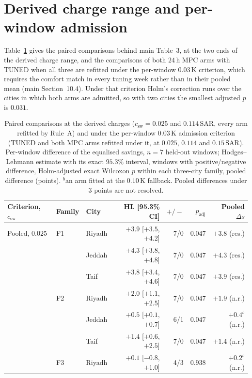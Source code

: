 \documentclass[11pt]{article}
\newcommand{\csw}{c_{\mathrm{sw}}}
\newcommand{\SAR}{\text{SAR}}
\begin{document}
\section{Derived charge range and per-window admission}
\label{sec:s-derived}

Table~\ref{tab:s-derived} gives the paired comparisons behind main Table~3, at the two ends of the derived charge range, and the comparisons of both $24\,$h MPC arms with TUNED when all three are refitted under the per-window $0.03\,$K criterion, which requires the comfort match in every tuning week rather than in their pooled mean (main Section~10.4). Under that criterion Holm's correction runs over the cities in which both arms are admitted, so with two cities the smallest adjusted $p$ is $0.031$.

\begin{table}[!ht]
\centering
\caption{Paired comparisons at the derived charges ($\csw=0.025$ and $0.114\,\SAR$, every arm refitted by Rule~A) and under the per-window $0.03\,$K admission criterion (TUNED and both MPC arms refitted under it, at $0.025$, $0.114$ and $0.15\,\SAR$). Per-window difference of the equalised savings, $n=7$ held-out windows; Hodges--Lehmann estimate with its exact $95.3\%$ interval, windows with positive/negative difference, Holm-adjusted exact Wilcoxon $p$ within each three-city family, pooled difference (points). $^{b}$an arm fitted at the $0.10\,$K fallback. Pooled differences under $3$ points are not resolved.}
\label{tab:s-derived}
\scriptsize
\setlength{\tabcolsep}{3pt}
\begin{tabularx}{\textwidth}{@{}llXrrrr@{}}
\toprule
Criterion, $\csw$ & Family & City & HL [95.3\% CI] & $+/-$ & $p_{\mathrm{adj}}$ & Pooled $\Delta s$ \\
\midrule
Pooled, $0.025$ & F1 & Riyadh & $+3.9$ [$+3.5$, $+4.2$] & 7/0 & $0.047$ & $+3.8$ (res.) \\
 &  & Jeddah & $+4.3$ [$+3.8$, $+4.8$] & 7/0 & $0.047$ & $+4.3$ (res.) \\
 &  & Taif & $+3.8$ [$+3.4$, $+4.6$] & 7/0 & $0.047$ & $+3.9$ (res.) \\
 & F2 & Riyadh & $+2.0$ [$+1.1$, $+2.5$] & 7/0 & $0.047$ & $+1.9$ (n.r.) \\
 &  & Jeddah & $+0.5$ [$+0.1$, $+0.7$] & 6/1 & $0.047$ & $+0.4^{b}$ (n.r.) \\
 &  & Taif & $+1.4$ [$+0.6$, $+2.5$] & 7/0 & $0.047$ & $+1.4$ (n.r.) \\
 & F3 & Riyadh & $+0.1$ [$-0.8$, $+1.0$] & 4/3 & $0.938$ & $+0.2^{b}$ (n.r.) \\

\end{tabularx}
\end{table}
\end{document}
